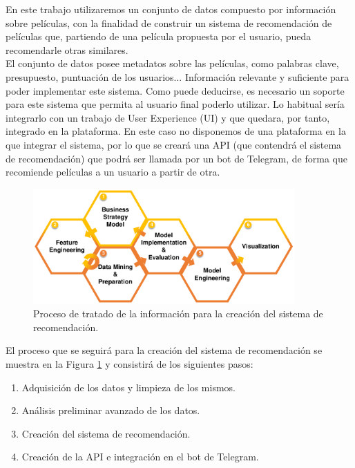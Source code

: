 En este trabajo utilizaremos un conjunto de datos compuesto por información sobre películas, con la finalidad de construir un sistema de recomendación de películas que, partiendo de una película propuesta por el usuario, pueda recomendarle otras similares.\\

El conjunto de datos posee metadatos sobre las películas, como palabras clave, presupuesto, puntuación de los usuarios... Información relevante y suficiente para poder implementar este sistema. Como puede deducirse, es necesario un soporte para este sistema que permita al usuario final poderlo utilizar. Lo habitual sería integrarlo con un trabajo de User Experience (UI) y que quedara, por tanto, integrado en la plataforma. En este caso no disponemos de una plataforma en la que integrar el sistema, por lo que se creará una API (que contendrá el sistema de recomendación) que podrá ser llamada por un bot de Telegram, de forma que recomiende películas a un usuario a partir de otra.\\

\begin{figure}[h]
    \centering
    \captionsetup{width=10cm}
    \includegraphics[width=10cm]{contenido/imagenes/DDSD.pdf}
    \caption{Proceso de tratado de la información para la creación del sistema de recomendación.}
    \label{fig:process}
\end{figure}

El proceso que se seguirá para la creación del sistema de recomendación se muestra en la Figura \ref{fig:process} y consistirá de los siguientes pasos:
\begin{enumerate}
    \item Adquisición de los datos y limpieza de los mismos.
    \item Análisis preliminar avanzado de los datos.
    \item Creación del sistema de recomendación.
    \item Creación de la API e integración en el bot de Telegram.
\end{enumerate}



